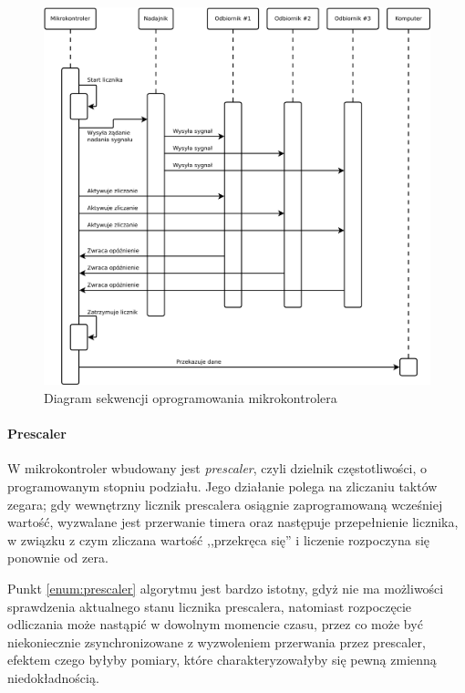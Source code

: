 \begin{figure}
 \hspace{-10em}
 \includegraphics[width=45em]{gfx/diagramy/diagram_sekwencji_sprzetu.pdf}
 \caption{Diagram sekwencji oprogramowania mikrokontrolera}
 \label{fig:firmware_sequence_diagram}
\end{figure}

\paragraph{Prescaler}
\label{sec:prescaler}
W mikrokontroler wbudowany jest \textsl{prescaler}, czyli dzielnik częstotliwości, o programowanym stopniu podziału. Jego działanie polega na zliczaniu taktów zegara; gdy wewnętrzny licznik prescalera osiągnie zaprogramowaną wcześniej wartość, wyzwalane jest przerwanie timera oraz następuje przepełnienie licznika, w związku z czym zliczana wartość ,,przekręca się'' i liczenie rozpoczyna się ponownie od zera.

Punkt \ref{enum:prescaler} algorytmu jest bardzo istotny, gdyż nie ma możliwości sprawdzenia aktualnego stanu licznika prescalera, natomiast rozpoczęcie odliczania może nastąpić w dowolnym momencie czasu, przez co może być niekoniecznie zsynchronizowane z wyzwoleniem przerwania przez prescaler, efektem czego byłyby pomiary, które charakteryzowałyby się pewną zmienną niedokładnością.

